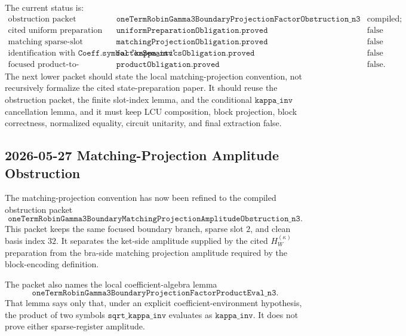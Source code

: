 The current status is:
\[
\begin{array}{lll}
\text{obstruction packet} &
\texttt{oneTermRobinGamma3BoundaryProjectionFactorObstruction\_n3} &
\text{compiled; semantic fields false}\\
\text{cited uniform preparation} &
\texttt{uniformPreparationObligation.proved} & \text{false}\\
\text{matching sparse-slot projection} &
\texttt{matchingProjectionObligation.proved} & \text{false}\\
\text{identification with }\texttt{Coeff.symbol "kappa\_inv"} &
\texttt{factorSemanticsObligation.proved} & \text{false}\\
\text{focused product-to-coefficient theorem} &
\texttt{productObligation.proved} & \text{false}.
\end{array}
\]
The next lower packet should state the local matching-projection convention,
not recursively formalize the cited state-preparation paper.  It should reuse
the obstruction packet, the finite slot-index lemma, and the conditional
\(\texttt{kappa\_inv}\) cancellation lemma, and it must keep LCU composition,
block projection, block correctness, normalized equality, circuit unitarity,
and final extraction false.

\subsection{2026-05-27 Matching-Projection Amplitude Obstruction}

The matching-projection convention has now been refined to the compiled
obstruction packet
\[
  \texttt{oneTermRobinGamma3BoundaryMatchingProjectionAmplitudeObstruction\_n3}.
\]
This packet keeps the same focused boundary branch, sparse slot \(2\), and
clean basis index \(32\).  It separates the ket-side amplitude supplied by the
cited \(H_W^{(\kappa)}\) preparation from the bra-side matching projection
amplitude required by the block-encoding definition.

The packet also names the local coefficient-algebra lemma
\[
  \texttt{oneTermRobinGamma3BoundaryProjectionFactorProductEval\_n3}.
\]
That lemma says only that, under an explicit coefficient-environment
hypothesis, the product of two symbols
\(\texttt{sqrt\_kappa\_inv}\) evaluates as
\(\texttt{kappa\_inv}\).  It does not prove either sparse-register amplitude.

